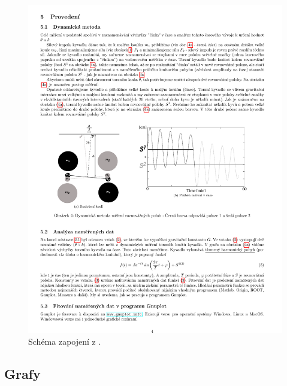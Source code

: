 \documentclass[english]{article}
\begin{document}
		\begin{figure}[h!]
				\begin{center}
				    	\includegraphics[width=\linewidth]{att/obr2.pdf}
						\caption{Schéma zapojení z \cite{bib:zadani}.}
						\label{fig:schema_2}
							    	
						
				\end{center}
			\end{figure}
	

\clearpage
\subsection{Grafy}
\end{document}
